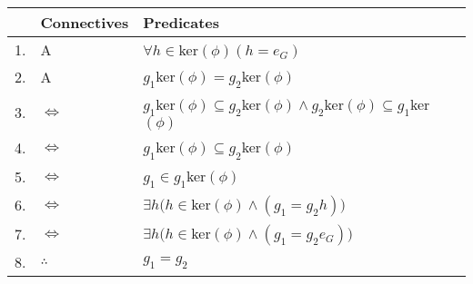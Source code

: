 \documentclass[12pt, a4paper]{article}
\begin{document}
\begin{center}
\begin{tabular}{ |p{3mm}||p{26mm}||p{8.5cm}| }
 \hline
 \hspace{1mm} &\textbf{Connectives} & \hspace{30mm}\textbf{Predicates}\\
 \hline
 
1. & \hspace{12mm}A & \hspace{3mm}$\forall h\in$ker$(\phi)(h=e_G)$\\
\hline
 
2. & \hspace{12mm}A & \hspace{3mm}$g_1$ker$(\phi)=g_2$ker$(\phi)$\\
\hline
 
3. & \hspace{11.5mm}$\Leftrightarrow$ & \hspace{3mm}$g_1$ker$(\phi)\subseteq g_2$ker$(\phi)\wedge g_2$ker$(\phi)\subseteq g_1$ker$(\phi)$\\
 \hline
 
4. & \hspace{11.5mm}$\Leftrightarrow$ & \hspace{3mm}$g_1$ker$(\phi)\subseteq g_2$ker$(\phi)$\\
 \hline
 
5. & \hspace{11.5mm}$\Leftrightarrow$ & \hspace{3mm}$g_1\in g_1$ker$(\phi)$\\
 \hline
 
6. & \hspace{11.5mm}$\Leftrightarrow$ & \hspace{3mm}$\exists h(h\in$ker$(\phi)\wedge(g_1=g_2h))$\\
 \hline
 
7. & \hspace{11.5mm}$\Leftrightarrow$ & \hspace{3mm}$\exists h(h\in$ker$(\phi)\wedge(g_1=g_2e_G))$\\
 \hline
 
8. & \hspace{12mm}$\therefore$ & \hspace{3mm}$g_1=g_2$ \\
\hline
 
 \hline
\end{tabular}
\end{center}
\end{document}
